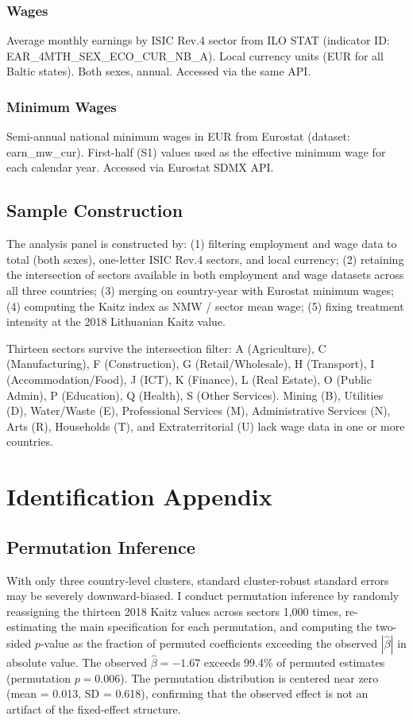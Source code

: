 \documentclass[12pt]{article}
\begin{document}
\subsubsection*{Wages} Average monthly earnings by ISIC Rev.4 sector from ILO STAT (indicator ID: EAR\_4MTH\_SEX\_ECO\_CUR\_NB\_A). Local currency units (EUR for all Baltic states). Both sexes, annual. Accessed via the same API.

\subsubsection*{Minimum Wages} Semi-annual national minimum wages in EUR from Eurostat (dataset: earn\_mw\_cur). First-half (S1) values used as the effective minimum wage for each calendar year. Accessed via Eurostat SDMX API.

\subsection{Sample Construction}

The analysis panel is constructed by: (1) filtering employment and wage data to total (both sexes), one-letter ISIC Rev.4 sectors, and local currency; (2) retaining the intersection of sectors available in both employment and wage datasets across all three countries; (3) merging on country-year with Eurostat minimum wages; (4) computing the Kaitz index as NMW / sector mean wage; (5) fixing treatment intensity at the 2018 Lithuanian Kaitz value.

Thirteen sectors survive the intersection filter: A (Agriculture), C (Manufacturing), F (Construction), G (Retail/Wholesale), H (Transport), I (Accommodation/Food), J (ICT), K (Finance), L (Real Estate), O (Public Admin), P (Education), Q (Health), S (Other Services). Mining (B), Utilities (D), Water/Waste (E), Professional Services (M), Administrative Services (N), Arts (R), Households (T), and Extraterritorial (U) lack wage data in one or more countries.

\section{Identification Appendix}

\subsection{Permutation Inference}

With only three country-level clusters, standard cluster-robust standard errors may be severely downward-biased. I conduct permutation inference by randomly reassigning the thirteen 2018 Kaitz values across sectors 1,000 times, re-estimating the main specification for each permutation, and computing the two-sided $p$-value as the fraction of permuted coefficients exceeding the observed $|\hat{\beta}|$ in absolute value. The observed $\hat{\beta} = -1.67$ exceeds 99.4\% of permuted estimates (permutation $p = 0.006$). The permutation distribution is centered near zero (mean = 0.013, SD = 0.618), confirming that the observed effect is not an artifact of the fixed-effect structure.
\end{document}
